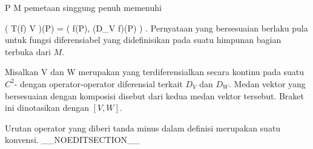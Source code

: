 \mavergleichskette
{\vergleichskette
{ P
}
{ \in }{ M
}
{  }{
}
{    }{
}
{   }{
}
}
{}{}{}
pemetaan singgung penuh memenuhi

\mavergleichskettedisp
{\vergleichskette
{ \left( T(f) \circ V \right)(P)
}
{ =} { \left( f(P), \left(D_V f\right)(P) \right)
}
{ } {
}
{ } {
}
{ } {
}
}
{}{}{.}
Pernyataan yang bersesuaian berlaku pula untuk fungsi diferensiabel yang didefinisikan pada suatu himpunan bagian terbuka dari $M$.

{}
{

Misalkan
\mathkor {} {V} {dan} {W} {}
merupakan
yang terdiferensialkan secara kontinu pada suatu
$C^2$-
dengan operator-operator diferensial terkait $D_V$ dan $D_W$. Medan vektor yang bersesuaian dengan komposisi
 disebut
dari kedua medan vektor tersebut. Braket ini dinotasikan dengan $[V,W]$.

}

Urutan operator yang diberi tanda minus dalam definisi merupakan suatu konvensi.
__NOEDITSECTION__

